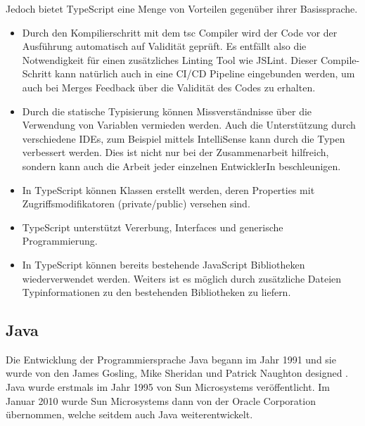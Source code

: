Jedoch bietet TypeScript eine Menge von Vorteilen 
gegenüber ihrer Basissprache.
\begin{itemize}
  \item Durch den Kompilierschritt mit dem tsc Compiler wird der 
    Code vor der Ausführung automatisch auf Validität geprüft. 
    Es entfällt also die Notwendigkeit für einen zusätzliches Linting 
    Tool wie JSLint. Dieser Compile-Schritt kann natürlich auch in eine 
    CI/CD Pipeline eingebunden werden, um auch bei Merges Feedback über die 
    Validität des Codes zu erhalten.
  \item Durch die statische Typisierung können Missverständnisse über 
    die Verwendung von Variablen vermieden werden. Auch die Unterstützung 
    durch verschiedene IDEs, zum Beispiel mittels IntelliSense kann durch die 
    Typen verbessert werden. Dies ist nicht nur bei der Zusammenarbeit hilfreich, 
    sondern kann auch die Arbeit jeder einzelnen EntwicklerIn beschleunigen.
  \item In TypeScript können Klassen erstellt werden, deren Properties mit 
    Zugriffsmodifikatoren (private/public) versehen sind.
  \item TypeScript unterstützt Vererbung, Interfaces und generische Programmierung.
  \item In TypeScript können bereits bestehende JavaScript Bibliotheken 
    wiederverwendet werden. Weiters ist es möglich durch zusätzliche Dateien 
    Typinformationen zu den bestehenden Bibliotheken zu liefern.
\end{itemize}

\subsection{Java}

Die Entwicklung der Programmiersprache Java begann im Jahr 1991 und sie 
wurde von den James Gosling, Mike Sheridan und Patrick Naughton designed \cite{WinnieDoug2021EJfA}.
Java wurde erstmals im Jahr 1995 von Sun Microsystems veröffentlicht. 
Im Januar 2010 wurde Sun Microsystems dann von der Oracle Corporation übernommen, 
welche seitdem auch Java weiterentwickelt.

